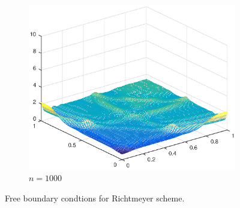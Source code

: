 \begin{figure}[h!]
\begin{subfigure}[t]{0.48\textwidth}
        \includegraphics[width=\textwidth]{images/sol_ri_1000.eps}
        \caption{$n=1000$}
        \label{fig:100}
    \end{subfigure}
    \caption{Free boundary condtions for Richtmeyer scheme.}
    \label{fig:2DSolutions_ri}
\end{figure}

